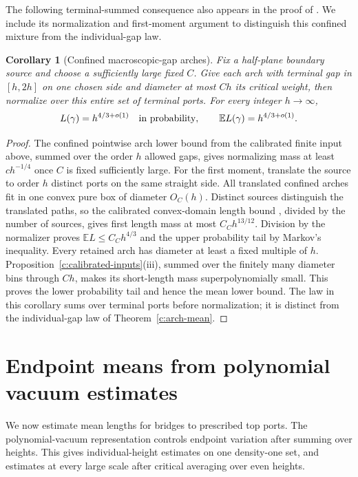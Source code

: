 \documentclass[11pt]{article}
\numberwithin{equation}{section}
\newtheorem{corollary}[theorem]{Corollary}
\theoremstyle{definition}\newtheorem{definition}[theorem]{Definition}
\theoremstyle{remark}\newtheorem{remark}[theorem]{Remark}
\begin{document}
The following terminal-summed consequence also appears in the proof of
\cite[Theorem~8.1]{Renewal}. We include its normalization and first-moment
argument to distinguish this confined mixture from the individual-gap law.
\begin{corollary}[Confined macroscopic-gap arches]\label{c:confined-arch-mean}
Fix a half-plane boundary source and choose a sufficiently large fixed
$C$. Give each arch with terminal gap in $[h,2h]$ on one chosen side
and diameter at most $Ch$ its critical weight, then normalize over
this entire set of terminal ports. For every integer $h\to\infty$,
\[
 L(\gamma)=h^{4/3+o(1)}\quad\hbox{in probability},\qquad
 \mathbb E L(\gamma)=h^{4/3+o(1)}.
\]
\end{corollary}
\begin{proof}
The confined pointwise arch lower bound from the calibrated finite
input above, summed over the order $h$ allowed gaps,
gives normalizing mass at least $ch^{-1/4}$ once $C$ is fixed sufficiently
large. For the first moment, translate the source to order $h$ distinct
ports on the same straight side. All translated confined arches fit in
one convex pure box of diameter $O_C(h)$. Distinct sources distinguish
the translated paths, so the calibrated convex-domain length bound
\cite[Proposition 11.1]{Calibrated}, divided by the number of sources,
gives first length mass at most $C_C h^{13/12}$. Division by the
normalizer proves $\mathbb E L\le C_C h^{4/3}$ and the upper probability
tail by Markov's inequality. Every retained arch has diameter at least
a fixed multiple of $h$. Proposition~\ref{c:calibrated-inputs}(iii),
summed over the finitely many diameter bins through $Ch$, makes its
short-length mass superpolynomially small. This proves the lower
probability tail and hence the mean lower bound. The law in this
corollary sums over terminal ports before normalization; it is distinct
from the individual-gap law of Theorem~\ref{c:arch-mean}.
\end{proof}

\section{Endpoint means from polynomial vacuum estimates}\label{c:pvmeans}
We now estimate mean lengths for bridges to prescribed top ports.
The polynomial-vacuum representation controls endpoint variation after
summing over heights. This gives individual-height estimates on one
density-one set, and estimates at every large scale after critical
averaging over even heights.
\end{document}
